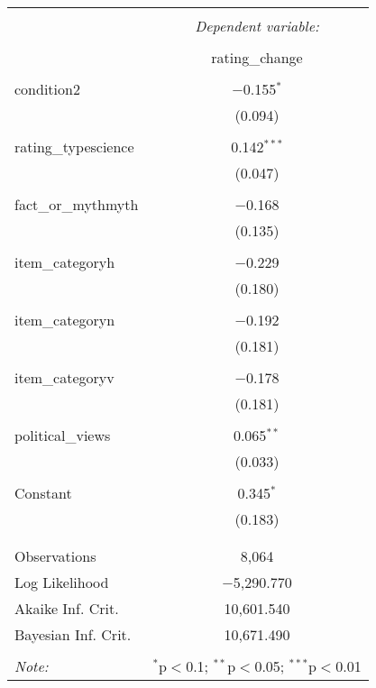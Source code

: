 
\begin{table}[!htbp] \centering 
  \caption{} 
  \label{} 
\begin{tabular}{@{\extracolsep{5pt}}lc} 
\\[-1.8ex]\hline 
\hline \\[-1.8ex] 
 & \multicolumn{1}{c}{\textit{Dependent variable:}} \\ 
\cline{2-2} 
\\[-1.8ex] & rating\_change \\ 
\hline \\[-1.8ex] 
 condition2 & $-$0.155$^{*}$ \\ 
  & (0.094) \\ 
  & \\ 
 rating\_typescience & 0.142$^{***}$ \\ 
  & (0.047) \\ 
  & \\ 
 fact\_or\_mythmyth & $-$0.168 \\ 
  & (0.135) \\ 
  & \\ 
 item\_categoryh & $-$0.229 \\ 
  & (0.180) \\ 
  & \\ 
 item\_categoryn & $-$0.192 \\ 
  & (0.181) \\ 
  & \\ 
 item\_categoryv & $-$0.178 \\ 
  & (0.181) \\ 
  & \\ 
 political\_views & 0.065$^{**}$ \\ 
  & (0.033) \\ 
  & \\ 
 Constant & 0.345$^{*}$ \\ 
  & (0.183) \\ 
  & \\ 
\hline \\[-1.8ex] 
Observations & 8,064 \\ 
Log Likelihood & $-$5,290.770 \\ 
Akaike Inf. Crit. & 10,601.540 \\ 
Bayesian Inf. Crit. & 10,671.490 \\ 
\hline 
\hline \\[-1.8ex] 
\textit{Note:}  & \multicolumn{1}{r}{$^{*}$p$<$0.1; $^{**}$p$<$0.05; $^{***}$p$<$0.01} \\ 
\end{tabular} 
\end{table} 
